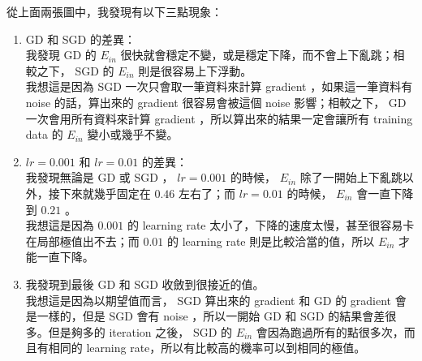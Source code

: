 \documentclass[12pt,a4paper]{article}
\begin{document}
從上面兩張圖中，我發現有以下三點現象：
\begin{enumerate}
	\item GD 和 SGD 的差異： \\
	我發現 GD 的 $E_{in}$ 很快就會穩定不變，或是穩定下降，而不會上下亂跳；相較之下， SGD 的 $E_{in}$ 則是很容易上下浮動。 \\
	我想這是因為 SGD 一次只會取一筆資料來計算 gradient ，如果這一筆資料有 noise 的話，算出來的 gradient 很容易會被這個 noise 影響；相較之下， GD 一次會用所有資料來計算 gradient ，所以算出來的結果一定會讓所有 training data 的 $E_{in}$ 變小或幾乎不變。
	\item $lr = 0.001$ 和 $lr = 0.01$ 的差異： \\
	我發現無論是 GD 或 SGD ， $lr = 0.001$ 的時候， $E_{in}$ 除了一開始上下亂跳以外，接下來就幾乎固定在 $0.46$ 左右了；而 $lr = 0.01$ 的時候， $E_{in}$ 會一直下降到 $0.21$ 。 \\
	我想這是因為 $0.001$ 的 learning rate 太小了，下降的速度太慢，甚至很容易卡在局部極值出不去；而 $0.01$ 的 learning rate 則是比較洽當的值，所以 $E_{in}$ 才能一直下降。
	\item 我發現到最後 GD 和 SGD 收斂到很接近的值。\\
	我想這是因為以期望值而言， SGD 算出來的 gradient 和 GD 的 gradient 會是一樣的，但是 SGD 會有 noise ，所以一開始 GD 和 SGD 的結果會差很多。但是夠多的 iteration 之後， SGD 的 $E_{in}$ 會因為跑過所有的點很多次，而且有相同的 learning rate，所以有比較高的機率可以到相同的極值。
\end{enumerate}
\end{document}
